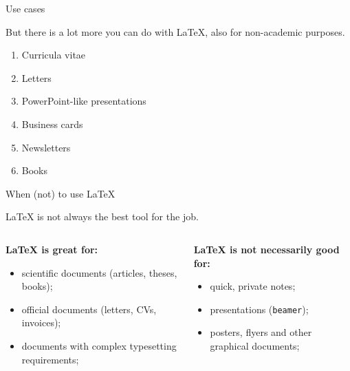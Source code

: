 \documentclass{beamer}
\newcommand{\code}[1]{\texttt{#1}}
\begin{document}
\begin{frame}{Use cases}

    But there is a lot more you can do with \LaTeX{}, also for non-academic purposes.

    \medskip

    \begin{enumerate}
        \item<2-> Curricula vitae
        \item<3-> Letters
        \item<4-> PowerPoint-like presentations
        \item<5-> Business cards
        \item<6-> Newsletters
        \item<7-> Books
    \end{enumerate}
\end{frame}

\begin{frame}{When (not) to use \LaTeX}

    \LaTeX{} is not always the best tool for the job.

    \bigskip


    \begin{columns}[t]
        \begin{column}{0.5\textwidth}
            \textbf{\LaTeX{} is great for:}
            \begin{itemize}
                \item<2-> scientific documents (articles, theses, books);
                \item<2-> official documents (letters, CVs, invoices);
                \item<2-> documents with complex typesetting requirements;
            \end{itemize}
        \end{column}
        \begin{column}{0.5\textwidth}
            \textbf{\LaTeX{} is not necessarily good for:}
            \begin{itemize}
                \item<3-> quick, private notes;
                \item<3-> presentations (\code{beamer});
                \item<3-> posters, flyers and other graphical documents;
            \end{itemize}
        \end{column}
    \end{columns}
\end{frame}
\end{document}
